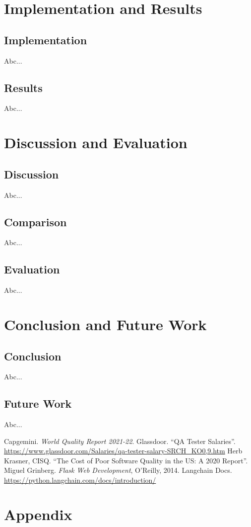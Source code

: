 \documentclass[12pt,a4paper]{report}
\begin{document}

\chapter{Implementation and Results}
\section{Implementation}
Abc...

\section{Results}
Abc...

\chapter{Discussion and Evaluation}
\section{Discussion}
Abc...

\section{Comparison}
Abc...

\section{Evaluation}
Abc...

\chapter{Conclusion and Future Work}
\section{Conclusion}
Abc...

\section{Future Work}
Abc...

\begin{thebibliography}{10}
 Capgemini. \textit{World Quality Report 2021-22}.
 Glassdoor. “QA Tester Salaries”. \url{https://www.glassdoor.com/Salaries/qa-tester-salary-SRCH_KO0,9.htm}
 Herb Krasner, CISQ. “The Cost of Poor Software Quality in the US: A 2020 Report”.
 Miguel Grinberg. \textit{Flask Web Development}, O’Reilly, 2014.
 Langchain Docs. \url{https://python.langchain.com/docs/introduction/}
\end{thebibliography}

\appendix
\chapter{Appendix}
\end{document}
